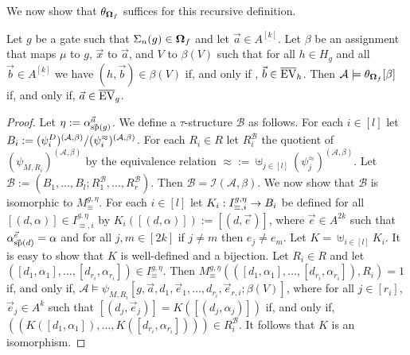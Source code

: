 \documentclass[../main/thesis.tex]{subfiles}
\begin{document}
We now show that $\theta_{\mathbf{\mathbf{\Omega}}_f}$ suffices for this recursive definition.
\begin{lem}
  Let $g$ be a gate such that $\Sigma_n (g) \in \mathbf{\mathbf{\Omega}}_f$ and let $\vec{a} \in
  A^{\underline{[k]}}$. Let $\beta$ be an assignment that maps $\mu$ to $g$,
  $\vec{x}$ to $\vec{a}$, and $V$ to $\beta(V)$ such that for all $h \in H_g$
  and all $\vec{b} \in A^{\underline{[k]}}$ we have $(h, \vec{b}) \in \beta(V)$
  if, and only if , $\vec{b} \in \overline{\text{EV}}_h$. Then $\mathcal{A} \models
  \theta_{\mathbf{\mathbf{\Omega}}_f}[\beta]$ if, and only if, $\vec{a} \in \overline{\text{EV}}_g$.
  \label{lem:inductive-EV-def}
\end{lem}
\begin{proof}
  Let $\eta := \alpha^{\vec{a}}_{\vec{\text{sp}}(g)}$. We define a $\tau$-structure
  $\mathcal{B}$ as follows. For each $i \in [l]$ let $B_i :=
  (\psi^D_i)^{(\mathcal{A}, \beta)} / (\psi^{\approx}_i)^{(\mathcal{A},
      \beta)}$. For each $R_i \in R$ let $R^{\mathcal{B}}_i$ the quotient of
  $(\psi_{M, R_i})^{(\mathcal{A}, \beta)}$ by the equivalence relation $\approx
  := \uplus_{j \in [l]}(\psi^{\approx}_j)^{(\mathcal{A}, \beta)}$. Let
  $\mathcal{B} := (B_1, \ldots, B_l ; R^{\mathcal{B}}_1, \ldots,
  R^{\mathcal{B}}_r)$. Then $\mathcal{B} = \mathcal{I}(\mathcal{A}, \beta)$. We
  now show that $\mathcal{B}$ is isomorphic to $M^{g, \eta}_{\equiv}$. For each
  $i \in [l]$ let $K_i : I^{g, \eta}_{\equiv, i} \rightarrow B_i$ be defined for all
  $[(d, \alpha)] \in I^{g, \eta}_{\equiv, i}$ by $K_i([(d, \alpha)]) := [(d,
  \vec{e})]$, where $\vec{e} \in A^{2k}$ such that
  $\alpha^{\vec{e}}_{\vec{\text{sp}}(d)} = \alpha$ and for all $j, m \in [2k]$ if
  $j \neq m$ then $e_j \neq e_m$. Let $K = \uplus_{i \in [l]}K_i$. It is easy to
  show that $K$ is well-defined and a bijection. Let $R_i \in R$ and let $([d_1,
  \alpha_1], \ldots, [d_{r_i}, \alpha_{r_i}]) \in I^{g, \eta}_{\equiv}$. Then
  $M^{g, \eta}_{\equiv} (([d_1, \alpha_1], \ldots, [d_{r_i}, \alpha_{r_i}]),
  R_i) = 1$ if, and only if, $\mathcal{A} \models \psi_{M, R_i}[g, \vec{a}, d_1,
  \vec{e}_1, \ldots, d_{r_i}, \vec{e}_{r, i}; \beta (V)]$, where for all $j \in
  [r_i]$, $\vec{e}_j \in A^k$ such that $[(d_j, \vec{e}_j)] = K([(d_j,
  \alpha_j)])$ if, and only if, $((K([d_1, \alpha_1]), \ldots, K([d_{r_i},
  \alpha_{r_i}]))) \in R^{\mathcal{B}}_i$. It follows that $K$ is an
  isomorphism.


\end{proof}
\end{document}
